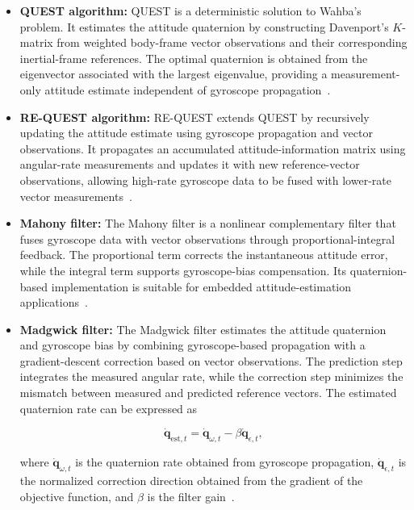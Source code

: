 \begin{itemize}
    \item \textbf{QUEST algorithm:} QUEST is a deterministic solution to Wahba's problem. It estimates the attitude quaternion by constructing Davenport's \(K\)-matrix from weighted body-frame vector observations and their corresponding inertial-frame references. The optimal quaternion is obtained from the eigenvector associated with the largest eigenvalue, providing a measurement-only attitude estimate independent of gyroscope propagation~\cite{crassidis2021spacecraft, bar1996request}.

    \item \textbf{RE-QUEST algorithm:} RE-QUEST extends QUEST by recursively updating the attitude estimate using gyroscope propagation and vector observations. It propagates an accumulated attitude-information matrix using angular-rate measurements and updates it with new reference-vector observations, allowing high-rate gyroscope data to be fused with lower-rate vector measurements~\cite{bar1996request}.

    \item \textbf{Mahony filter:} The Mahony filter is a nonlinear complementary filter that fuses gyroscope data with vector observations through proportional-integral feedback. The proportional term corrects the instantaneous attitude error, while the integral term supports gyroscope-bias compensation. Its quaternion-based implementation is suitable for embedded attitude-estimation applications~\cite{10850038}.

    \item \textbf{Madgwick filter:} The Madgwick filter estimates the attitude quaternion and gyroscope bias by combining gyroscope-based propagation with a gradient-descent correction based on vector observations. The prediction step integrates the measured angular rate, while the correction step minimizes the mismatch between measured and predicted reference vectors. The estimated quaternion rate can be expressed as

    \begin{equation}
        \dot{\mathbf{q}}_{\mathrm{est},t}
        =
        \dot{\mathbf{q}}_{\omega,t}
        -
        \beta
        \dot{\mathbf{q}}_{\epsilon,t},
        \label{eq:adcs_madgwick_estimated_rate}
    \end{equation}

    where \(\dot{\mathbf{q}}_{\omega,t}\) is the quaternion rate obtained from gyroscope propagation, \(\dot{\mathbf{q}}_{\epsilon,t}\) is the normalized correction direction obtained from the gradient of the objective function, and \(\beta\) is the filter gain~\cite{madgwick2010filter}.


\end{itemize}

